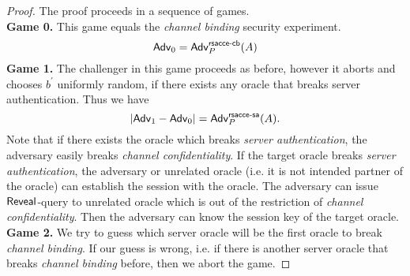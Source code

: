 \begin{proof}
 The proof proceeds in a sequence of games. \vspace{10pt}\\
 \textbf{Game 0.} This game equals the \textit{channel binding} security experiment.
 \begin{equation}
  \mathsf{Adv}_0 = \mathsf{Adv}^{\mathsf{rsacce\textsc{-} cb}}_{P}(A)
 \end{equation}%
%
%
 \textbf{Game 1.} The challenger in this game proceeds as before, however it aborts and chooses $b^{\prime}$ uniformly random, if there exists any oracle that breaks server authentication. Thus we have
 \begin{equation}
  |\mathsf{Adv}_1 - \mathsf{Adv}_0| = \mathsf{Adv}^{\mathsf{rsacce\textsc{-} sa}}_{P}(A).
 \end{equation}%
 Note that if there exists the oracle which breaks \textit{server authentication}, the adversary easily breaks \textit{channel confidentiality}. If the target oracle breaks \textit{server authentication}, the adversary or unrelated oracle (i.e. it is not intended partner of the oracle) can establish the session with the oracle. The adversary can issue $\mathsf{Reveal}$-query to unrelated oracle which is out of the restriction of \textit{channel confidentiality}. Then the adversary can know the session key of the target oracle.
\vspace{10pt}\\%
%
%
 \textbf{Game 2.} We try to guess which server oracle will be the first oracle to break \textit{channel binding}. If our guess is wrong, i.e. if there is another server oracle that breaks \textit{channel binding} before, then we abort the game.


\end{proof}
